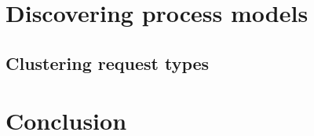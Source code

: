 \documentclass[a4paper, 12pt]{article}
\let\stdsection\section
\renewcommand\section{\newpage\stdsection}
\begin{document}
\section{Discovering process models}

\subsection{Clustering request types}


\section{Conclusion}
\label{Conclusion} 
\pagebreak


\footnotesize
{}
\end{document}
